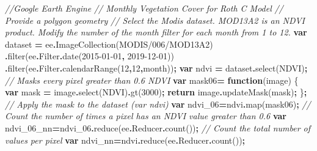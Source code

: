 \documentclass[
  10pt,
  b5paper,
]{book}
\newenvironment{Shaded}{\begin{snugshade}}{\end{snugshade}}
\newcommand{\AttributeTok}[1]{\textcolor[rgb]{0.77,0.63,0.00}{#1}}
\newcommand{\CommentTok}[1]{\textcolor[rgb]{0.56,0.35,0.01}{\textit{#1}}}
\newcommand{\ControlFlowTok}[1]{\textcolor[rgb]{0.13,0.29,0.53}{\textbf{#1}}}
\newcommand{\DecValTok}[1]{\textcolor[rgb]{0.00,0.00,0.81}{#1}}
\newcommand{\FunctionTok}[1]{\textcolor[rgb]{0.00,0.00,0.00}{#1}}
\newcommand{\KeywordTok}[1]{\textcolor[rgb]{0.13,0.29,0.53}{\textbf{#1}}}
\newcommand{\NormalTok}[1]{#1}
\newcommand{\OperatorTok}[1]{\textcolor[rgb]{0.81,0.36,0.00}{\textbf{#1}}}
\newcommand{\StringTok}[1]{\textcolor[rgb]{0.31,0.60,0.02}{#1}}
\begin{document}
\begin{Shaded}
\begin{Highlighting}[]
\CommentTok{//Google Earth Engine }
\CommentTok{// Monthly Vegetation Cover for Roth C Model   }
 \CommentTok{// Provide a polygon geometry}
 \CommentTok{// Select the Modis dataset. MOD13A2 is an NDVI product. Modify the number of the month filter for each month from 1 to 12. }
 \KeywordTok{var}\NormalTok{ dataset }\OperatorTok{=}\NormalTok{ ee}\OperatorTok{.}\FunctionTok{ImageCollection}\NormalTok{(}\StringTok{\textquotesingle{}MODIS/006/MOD13A2\textquotesingle{}}\NormalTok{)}
                  \OperatorTok{.}\FunctionTok{filter}\NormalTok{(ee}\OperatorTok{.}\AttributeTok{Filter}\OperatorTok{.}\FunctionTok{date}\NormalTok{(}\StringTok{\textquotesingle{}2015{-}01{-}01\textquotesingle{}}\OperatorTok{,} \StringTok{\textquotesingle{}2019{-}12{-}01\textquotesingle{}}\NormalTok{))}
                  \OperatorTok{.}\FunctionTok{filter}\NormalTok{(ee}\OperatorTok{.}\AttributeTok{Filter}\OperatorTok{.}\FunctionTok{calendarRange}\NormalTok{(}\DecValTok{12}\OperatorTok{,}\DecValTok{12}\OperatorTok{,}\StringTok{\textquotesingle{}month\textquotesingle{}}\NormalTok{))}\OperatorTok{;}
 \KeywordTok{var}\NormalTok{ ndvi }\OperatorTok{=}\NormalTok{ dataset}\OperatorTok{.}\FunctionTok{select}\NormalTok{(}\StringTok{\textquotesingle{}NDVI\textquotesingle{}}\NormalTok{)}\OperatorTok{;}
 \CommentTok{// Masks every pixel greater than 0.6 NDVI}
\KeywordTok{var}\NormalTok{ mask06}\OperatorTok{=} \KeywordTok{function}\NormalTok{(image) \{}
    \KeywordTok{var}\NormalTok{ mask }\OperatorTok{=}\NormalTok{ image}\OperatorTok{.}\FunctionTok{select}\NormalTok{(}\StringTok{\textquotesingle{}NDVI\textquotesingle{}}\NormalTok{)}\OperatorTok{.}\FunctionTok{gt}\NormalTok{(}\DecValTok{3000}\NormalTok{)}\OperatorTok{;}
    \ControlFlowTok{return}\NormalTok{ image}\OperatorTok{.}\FunctionTok{updateMask}\NormalTok{(mask)}\OperatorTok{;}
\NormalTok{  \}}\OperatorTok{;}
 \CommentTok{// Apply the mask to the dataset (var ndvi)}
\KeywordTok{var}\NormalTok{ ndvi\_06}\OperatorTok{=}\NormalTok{ndvi}\OperatorTok{.}\FunctionTok{map}\NormalTok{(mask06)}\OperatorTok{;} 
 \CommentTok{// Count the number of times a pixel has an NDVI value greater than 0.6}
\KeywordTok{var}\NormalTok{ ndvi\_06\_nn}\OperatorTok{=}\NormalTok{ndvi\_06}\OperatorTok{.}\FunctionTok{reduce}\NormalTok{(ee}\OperatorTok{.}\AttributeTok{Reducer}\OperatorTok{.}\FunctionTok{count}\NormalTok{())}\OperatorTok{;}
 \CommentTok{// Count the total number of values per pixel}
\KeywordTok{var}\NormalTok{ ndvi\_nn}\OperatorTok{=}\NormalTok{ndvi}\OperatorTok{.}\FunctionTok{reduce}\NormalTok{(ee}\OperatorTok{.}\AttributeTok{Reducer}\OperatorTok{.}\FunctionTok{count}\NormalTok{())}\OperatorTok{;}

\end{Highlighting}
\end{Shaded}
\end{document}
